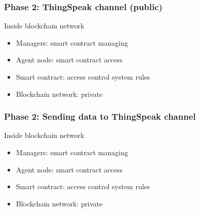 \documentclass[
    aspectratio=169,                   %
]{beamer}
\begin{document}
    \begin{frame}
        \frametitle{Phase 2: ThingSpeak channel (public)}

        

        \begin{block}{Inside blockchain network}
            \begin{itemize}
            \item \alert{Managers}: smart contract managing
            \item \alert{Agent node}: smart contract access
            \item \alert{Smart contract}: access control system rules
            \item \alert{Blockchain network}: private
            \end{itemize}
        \end{block}
    \end{frame}

    \begin{frame}
        \frametitle{Phase 2: Sending data to ThingSpeak channel}

        

        \begin{block}{Inside blockchain network}
            \begin{itemize}
            \item \alert{Managers}: smart contract managing
            \item \alert{Agent node}: smart contract access
            \item \alert{Smart contract}: access control system rules
            \item \alert{Blockchain network}: private
            \end{itemize}
        \end{block}
    \end{frame}
\end{document}
